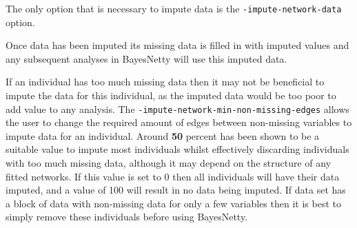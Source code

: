\documentclass[a4paper,12pt]{article}
\newcommand{\code}[1]{{\footnotesize{{\tt #1}}}}
\begin{document}
{\begin{center}\end{center}}

The only option that is necessary to impute data is the \code{-impute-network-data} option. 

Once data has been imputed its missing data is filled in with imputed values and any subsequent analyses in BayesNetty will use this imputed data. 

If an individual has too much missing data then it may not be beneficial to impute the data for this individual, as the imputed data would be too poor to add value to any analysis. The \code{-impute-network-min-non-missing-edges} allows the user to change the required amount of edges between non-missing variables to impute data for an individual. Around {\bf 50} percent has been shown to be a suitable value to impute most individuals whilst effectively discarding individuals with too much missing data, although it may depend on the structure of any fitted networks. If this value is set to 0 then all individuals will have their data imputed, and a value of 100 will result in no data being imputed. If data set has a block of data with non-missing data for only a few variables then it is best to simply remove these individuals before using BayesNetty. 
\end{document}
